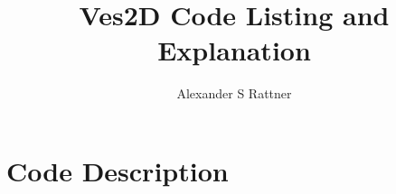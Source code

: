 \documentclass[12pt,a4paper,oneside]{report}
\begin{document}
\pagestyle{fancy}
\chead{}
\rhead{ \thepage/\pageref{LastPage}}
\lfoot{}
\cfoot{}
\rfoot{}
\setlength{\headheight}{17pt}

\title{Ves2D Code Listing and Explanation}
\author{Alexander S Rattner}
\maketitle
\newpage 

\tableofcontents

\newpage

\section{Code Description}



%
\end{document}
